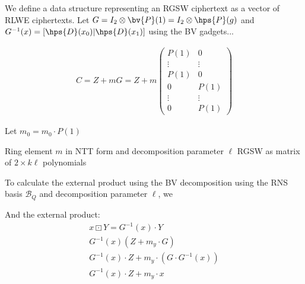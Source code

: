 
\begin{definition}
    We define a data structure representing an RGSW ciphertext as a vector of RLWE ciphertexts. Let $G = I_2\otimes \bv{P}(1) = I_2\otimes \hps{P}(g)$ and $G^{-1}(x) = [\hps{D}(x_0)|\hps{D}(x_1)]$ using the BV gadgets... 

    \begin{gather}
        C = Z + mG = Z + m\begin{pmatrix}
            P(1) & 0 \\
            \vdots & \vdots \\
            P(1) & 0 \\
            0 & P(1) \\
            \vdots & \vdots \\
            0 & P(1)
        \end{pmatrix}
    \end{gather}

    Let $m_0 = m_0\cdot P(1)$

    \begin{algorithm}
    \caption{Encrypt RGSW-BV}
    \label{alg:rgsw:bv}
    \begin{algorithmic}[1]
    \Require Ring element $m$ in NTT form and decomposition parameter $\ell$
    \Ensure RGSW as matrix of $2\times k \ell$ polynomials
    
    \end{algorithmic}
    \end{algorithm}
\end{definition}

\begin{definition}
    To calculate the external product using the BV decomposition using the RNS basis $\mathcal{B}_Q$ and decomposition parameter $\ell$, %
    we 

    

    And the external product:
    \begin{gather}
        x\boxdot Y = G^{-1}(x)\cdot Y \\
        G^{-1}(x)(Z + m_y\cdot G) \\
        G^{-1}(x)\cdot Z + m_y\cdot (G\cdot G^{-1}(x)) \\
        G^{-1}(x)\cdot Z + m_y \cdot x
    \end{gather}
\end{definition}

